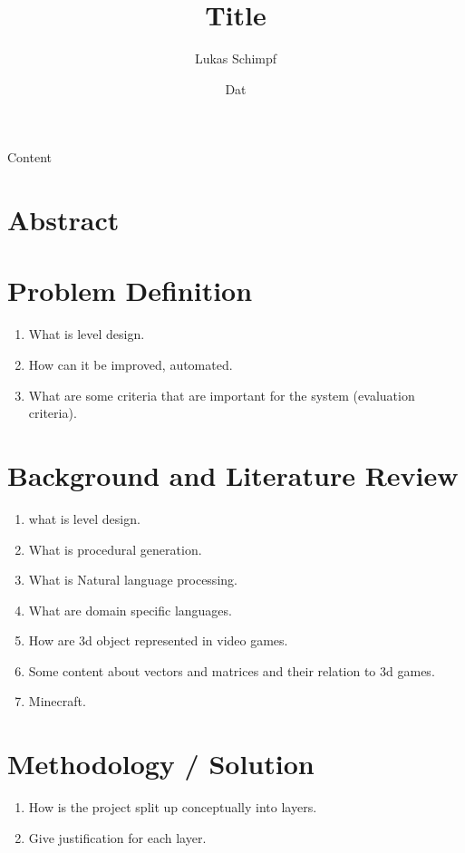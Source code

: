 \documentclass[11pt, a4paper]{article}
\begin{document}
\title{Title}
\author{Lukas Schimpf}
\date{Dat}
\maketitle
\pagebreak

\begin{flushleft}
Content

\section*{Abstract}

\section*{Problem Definition}
\begin{enumerate}
    \item What is level design.
    \item How can it be improved, automated.
    \item What are some criteria that are important for the system (evaluation criteria).
\end{enumerate}

\section*{Background and Literature Review}
\begin{enumerate}
    \item what is level design.
    \item What is procedural generation.
    \item What is Natural language processing.
    \item What are domain specific languages.
    \item How are 3d object represented in video games.
    \item Some content about vectors and matrices and their relation to 3d games.
    \item Minecraft.
\end{enumerate}

\section*{Methodology / Solution}
\begin{enumerate}
    \item How is the project split up conceptually into layers.
    \item Give justification for each layer.
\end{enumerate}


\end{flushleft}
\end{document}
